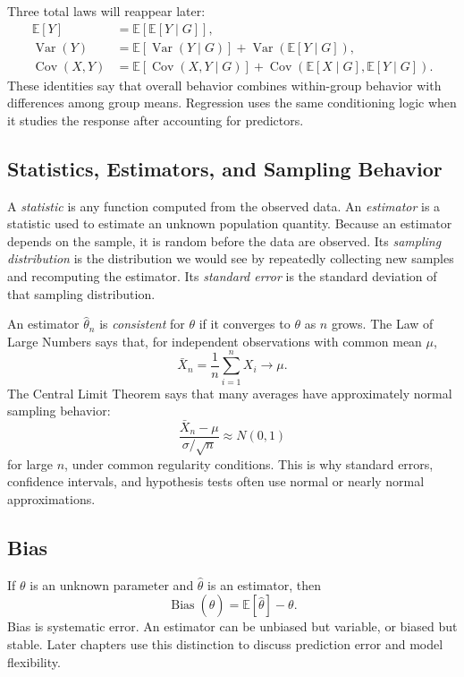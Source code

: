 {Three total laws will reappear later:
\begin{align}
  \mathbb{E}[Y]&=\mathbb{E}\!\left[\mathbb{E}[Y\mid G]\right], \\
  \operatorname{Var}(Y)
  &=
  \mathbb{E}\!\left[\operatorname{Var}(Y\mid G)\right]
  +
  \operatorname{Var}\!\left(\mathbb{E}[Y\mid G]\right), \\
  \operatorname{Cov}(X,Y)
  &=
  \mathbb{E}\!\left[\operatorname{Cov}(X,Y\mid G)\right]
  +
  \operatorname{Cov}\!\left(\mathbb{E}[X\mid G],\mathbb{E}[Y\mid G]\right).
\end{align}
These identities say that overall behavior combines within-group behavior with differences among group means.  Regression uses the same conditioning logic when it studies the response after accounting for predictors.

\subsection{Statistics, Estimators, and Sampling Behavior}

A \emph{statistic} is any function computed from the observed data.  An \emph{estimator} is a statistic used to estimate an unknown population quantity.  Because an estimator depends on the sample, it is random before the data are observed.  Its \emph{sampling distribution} is the distribution we would see by repeatedly collecting new samples and recomputing the estimator.  Its \emph{standard error} is the standard deviation of that sampling distribution.

An estimator \(\widehat{\theta}_n\) is \emph{consistent} for \(\theta\) if it converges to \(\theta\) as \(n\) grows.  The Law of Large Numbers says that, for independent observations with common mean \(\mu\),
\[
  \bar{X}_n=\frac{1}{n}\sum_{i=1}^n X_i\longrightarrow \mu.
\]
The Central Limit Theorem says that many averages have approximately normal sampling behavior:
\[
  \frac{\bar{X}_n-\mu}{\sigma/\sqrt{n}}\approx N(0,1)
\]
for large \(n\), under common regularity conditions.  This is why standard errors, confidence intervals, and hypothesis tests often use normal or nearly normal approximations.

\subsection{Bias}

If $\theta$ is an unknown parameter and $\widehat{\theta}$ is an estimator, then
\begin{equation}
  \operatorname{Bias}(\widehat{\theta})=\mathbb{E}[\widehat{\theta}]-\theta.
\end{equation}
Bias is systematic error.  An estimator can be unbiased but variable, or biased but stable.  Later chapters use this distinction to discuss prediction error and model flexibility.
}
